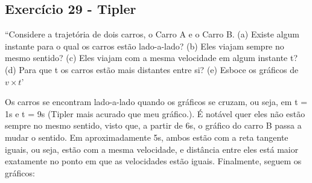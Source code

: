 \documentclass{article}
\begin{document}
 \subsection{Exerc\'icio 29 - Tipler}
 ``Considere a trajet\'oria de dois carros, o Carro A e o Carro B. (a) Existe algum instante para o qual os carros est\~ao lado-a-lado? (b) Eles viajam sempre no mesmo sentido? (c) Eles viajam com a mesma velocidade em algum instante t? (d) Para que t os carros est\~ao mais distantes entre si? (e) Esboce os gr\'aficos de $v\times t$'
 \begin{center}
\end{center}
  Os carros se encontram lado-a-lado quando os gr\'aficos se cruzam, ou seja, em t = 1s e t = 9s (Tipler mais acurado que meu gr\'afico.). \'E not\'avel
quer eles n\~ao est\~ao sempre no mesmo sentido, visto que, a partir de 6s, o gr\'afico do carro B passa a mudar o sentido. Em aproximadamente 5s,
ambos est\~ao com a reta tangente iguais, ou seja, est\~ao com a mesma velocidade, e dist\^ancia entre eles est\'a maior exatamente no ponto em que as 
velocidades est\~ao iguais. Finalmente, seguem os gr\'aficos:
\begin{center}
\end{center}
\end{document}
